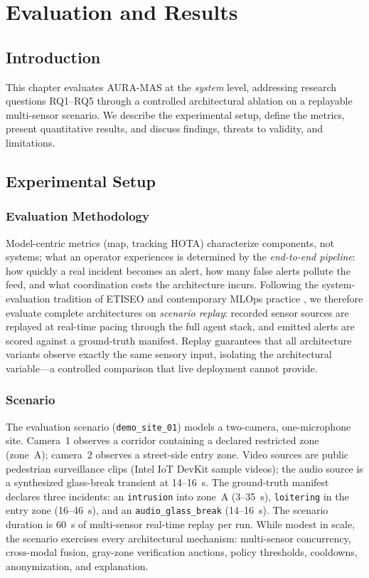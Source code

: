\chapter{Evaluation and Results}
\label{chap:evaluation}

\section{Introduction}

This chapter evaluates AURA-MAS at the \emph{system} level, addressing research questions RQ1--RQ5 through a controlled architectural ablation on a replayable multi-sensor scenario. We describe the experimental setup, define the metrics, present quantitative results, and discuss findings, threats to validity, and limitations.

\section{Experimental Setup}

\subsection{Evaluation Methodology}

Model-centric metrics (\gls{map}, tracking HOTA) characterize components, not systems; what an operator experiences is determined by the \emph{end-to-end pipeline}: how quickly a real incident becomes an alert, how many false alerts pollute the feed, and what coordination costs the architecture incurs. Following the system-evaluation tradition of ETISEO \cite{nghiem2007etiseo} and contemporary MLOps practice \cite{aicity2025, ruf2021demystifying}, we therefore evaluate complete architectures on \emph{scenario replay}: recorded sensor sources are replayed at real-time pacing through the full agent stack, and emitted alerts are scored against a ground-truth manifest. Replay guarantees that all architecture variants observe exactly the same sensory input, isolating the architectural variable---a controlled comparison that live deployment cannot provide.

\subsection{Scenario}

The evaluation scenario (\texttt{demo\_site\_01}) models a two-camera, one-microphone site. Camera~1 observes a corridor containing a declared restricted zone (zone~A); camera~2 observes a street-side entry zone. Video sources are public pedestrian surveillance clips (Intel IoT DevKit sample videos); the audio source is a synthesized glass-break transient at 14--16~s. The ground-truth manifest declares three incidents: an \texttt{intrusion} into zone~A (3--35~s), \texttt{loitering} in the entry zone (16--46~s), and an \texttt{audio\_glass\_break} (14--16~s). The scenario duration is 60~s of multi-sensor real-time replay per run. While modest in scale, the scenario exercises every architectural mechanism: multi-sensor concurrency, cross-modal fusion, gray-zone verification auctions, policy thresholds, cooldowns, anonymization, and explanation.

